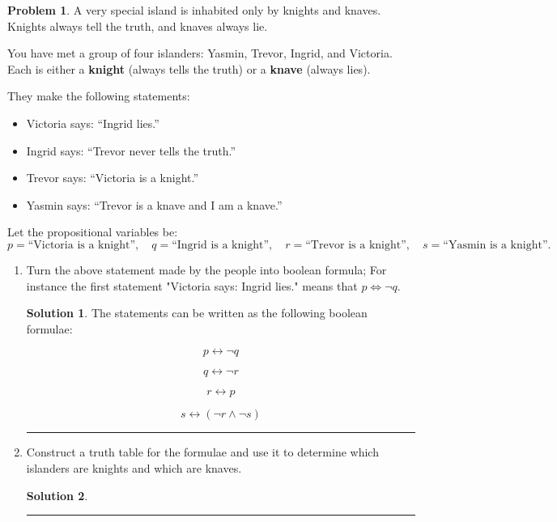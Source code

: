 \documentclass{article}
\theoremstyle{definition}
\newtheorem{problem}{Problem}
\def\fline{\rule{0.75\linewidth}{0.5pt}}
\newcommand{\finishline}{\begin{center}\fline\end{center}}
\newtheorem*{solution*}{Solution}
\newenvironment{solution}{\begin{solution*}}{{\finishline} \end{solution*}}
\begin{document}
\begin{problem}

A very special island is inhabited only by knights and knaves. Knights always tell the truth, and knaves always lie.

You have met a group of four islanders: Yasmin, Trevor, Ingrid, and Victoria.  
Each is either a \textbf{knight} (always tells the truth) or a \textbf{knave} (always lies).  

They make the following statements:  
\begin{itemize}
    \item Victoria says: ``Ingrid lies.''
    \item Ingrid says: ``Trevor never tells the truth.''
    \item Trevor says: ``Victoria is a knight.''
    \item Yasmin says: ``Trevor is a knave and I am a knave.''
\end{itemize}

Let the propositional variables be:  
\[
p = \text{``Victoria is a knight''}, \quad
q = \text{``Ingrid is a knight''}, \quad
r = \text{``Trevor is a knight''}, \quad
s = \text{``Yasmin is a knight''}.
\]

\begin{enumerate}[label=(\alph*)]
    \item Turn the above statement made by the people into boolean formula; For instance the first statement "Victoria says: Ingrid lies." means that $p \iff \neg q$. 

    \begin{solution}

        The statements can be written as the following boolean formulae:

        \[
        p \leftrightarrow \neg q
        \]

        \[
        q \leftrightarrow \neg r
        \]

        \[
        r \leftrightarrow p
        \]

        \[
        s \leftrightarrow (\neg r \land \neg s)
        \]

    \end{solution}
    \item Construct a truth table for the formulae and use it to determine which islanders are knights and which are knaves.

    \begin{solution}


\end{solution}
\end{enumerate}
\end{problem}
\end{document}
